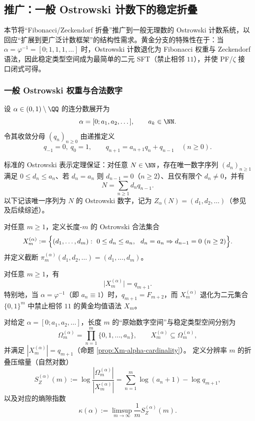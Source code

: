 \subsection{推广：一般 Ostrowski 计数下的稳定折叠}\label{subsec:ostrowski-generalized-fold}

本节将“Fibonacci/Zeckendorf 折叠”推广到一般无理数的 Ostrowski 计数系统，以回应“扩展到更广泛计数框架”的结构性需求。黄金分支的特殊性在于：当 $\alpha=\varphi^{-1}=[0;1,1,1,\dots]$ 时，Ostrowski 计数退化为 Fibonacci 权重与 Zeckendorf 语法，因此稳定类型空间成为最简单的二元 SFT（禁止相邻 $11$），并使 PF/$\zeta$ 接口闭式可得。

\subsubsection{一般 Ostrowski 权重与合法数字}

设 $\alpha\in(0,1)\setminus\QQ$ 的连分数展开为
\[
\alpha=[0;a_1,a_2,\dots],\qquad a_k\in\NN.
\]
令其收敛分母 $(q_n)_{n\ge 0}$ 由递推定义
\[
q_{-1}=0,\ q_0=1,\qquad q_{n+1}=a_{n+1}q_n+q_{n-1}\quad(n\ge 0).
\]

标准的 Ostrowski 表示定理保证：对任意 $N\in\NN$，存在唯一数字序列 $(d_n)_{n\ge 1}$ 满足
\(0\le d_n\le a_n\)、若 $d_n=a_n$ 则 $d_{n-1}=0$（$n\ge 2$）、且仅有限个 $d_n\neq 0$，并有
\[
N=\sum_{n\ge 1} d_n q_{n-1}.
\]
以下记该唯一序列为 $N$ 的 Ostrowski 数字，记为 $Z_\alpha(N)=(d_1,d_2,\dots)$（参见 \cite{Ostrowski1922} 及后续综述）。

\begin{definition}[一般稳定类型空间]\label{def:Xm-alpha}
对任意 $m\ge 1$，定义长度-$m$ 的 Ostrowski 合法集合
\[
X_m^{(\alpha)}:=\Bigl\{(d_1,\dots,d_m):\ 0\le d_n\le a_n,\ \ d_n=a_n\Rightarrow d_{n-1}=0\ (n\ge 2)\Bigr\}.
\]
并定义截断 $\pi_m^{(\alpha)}(d_1,d_2,\dots)=(d_1,\dots,d_m)$。
\end{definition}

\begin{proposition}\label{prop:Xm-alpha-cardinality}
对任意 $m\ge 1$，有
\[
\bigl|X_m^{(\alpha)}\bigr|=q_{m+1}.
\]
特别地，当 $\alpha=\varphi^{-1}$（即 $a_n\equiv 1$）时，$q_{m+1}=F_{m+2}$，而 $X_m^{(\alpha)}$ 退化为二元集合 $\{0,1\}^m$ 中禁止相邻 $11$ 的黄金均值语法 $X_m$。
\end{proposition}

\begin{definition}\label{def:ostrowski-entropy-gap}
对给定 $\alpha=[0;a_1,a_2,\dots]$，长度 $m$ 的“原始数字空间”与稳定类型空间分别为
\[
\Omega_m^{(\alpha)}=\prod_{n=1}^{m}\{0,1,\dots,a_n\},
\qquad
X_m^{(\alpha)}\subseteq \Omega_m^{(\alpha)},
\]
并满足 $|X_m^{(\alpha)}|=q_{m+1}$（命题 \ref{prop:Xm-alpha-cardinality}）。
定义分辨率 $m$ 的折叠压缩量（自然对数）
\[
S_Z^{(\alpha)}(m):=\log\frac{|\Omega_m^{(\alpha)}|}{|X_m^{(\alpha)}|}
=\sum_{n=1}^{m}\log(a_n+1)-\log q_{m+1},
\]
以及对应的熵隙指数
\[
\kappa(\alpha):=\limsup_{m\to\infty}\frac{1}{m}S_Z^{(\alpha)}(m).
\]
\end{definition}

